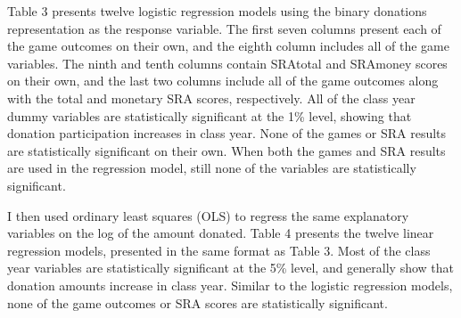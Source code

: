 \documentclass[12pt]{article}
\begin{document}
Table 3 presents twelve logistic regression models using the binary donations representation as the response variable. The first seven columns present each of the game outcomes on their own, and the eighth column includes all of the game variables. The ninth and tenth columns contain SRAtotal and SRAmoney scores on their own, and the last two columns include all of the game outcomes along with the total and monetary SRA scores, respectively. All of the class year dummy variables are statistically significant at the 1\% level, showing that donation participation increases in class year. None of the games or SRA results are statistically significant on their own. When both the games and SRA results are used in the regression model, still none of the variables are statistically significant. 

I then used ordinary least squares (OLS) to regress the same explanatory variables on the log of the amount donated. Table 4 presents the twelve linear regression models, presented in the same format as Table 3. Most of the class year variables are statistically significant at the 5\% level, and generally show that donation amounts increase in class year. Similar to the logistic regression models, none of the game outcomes or SRA scores are statistically significant.
\end{document}
